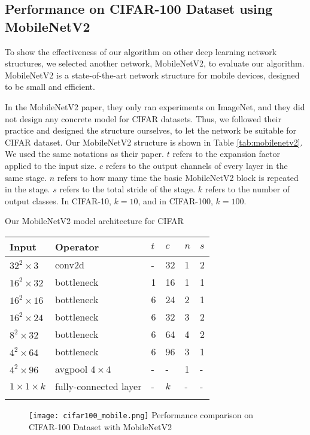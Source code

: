 \subsection{Performance on CIFAR-100 Dataset using MobileNetV2}

To show the effectiveness of our algorithm on other deep learning network structures, we selected another network, MobileNetV2\cite{sandler2018inverted}, to evaluate our algorithm. MobileNetV2 is a state-of-the-art network structure for mobile devices, designed to be small and efficient.

In the MobileNetV2 paper, they only ran experiments on ImageNet, and they did not design any concrete model for CIFAR datasets. Thus, we followed their practice and designed the structure ourselves, to let the network be suitable for CIFAR dataset. Our MobileNetV2 structure is shown in Table \ref{tab:mobilenetv2}. We used the same notations as their paper. $t$ refers to the expansion factor applied to the input size. $c$ refers to the output channels of every layer in the same stage. $n$ refers to how many time the basic MobileNetV2 block is repeated in the stage. $s$ refers to the total stride of the stage. $k$ refers to the number of output classes. In CIFAR-10, $k=10$, and in CIFAR-100, $k=100$.
\begin{table}[!hpb]
	\centering
	{Our MobileNetV2 model architecture for CIFAR}
	\label{tab:mobilenetv2}
	\begin{tabular}{@{}llllll@{}} \toprule
		Input & Operator & $t$ & $c$ & $n$ & $s$\\ \midrule
		$32^2\times3$ & conv2d & - &32&1&2\\ 
		$16^2\times32$ & bottleneck & 1 &16&1&1\\ 
		$16^2\times16$ & bottleneck & 6 &24&2&1\\ 
		$16^2\times24$ & bottleneck & 6 &32&3&2\\ 
		$8^2\times32$ & bottleneck & 6 &64&4&2\\ 		
		$4^2\times64$ & bottleneck & 6 &96&3&1\\ 
		$4^2\times96$ & avgpool $4\times4$ & - &-&1&-\\ 	
		$1\times1\times k$ & fully-connected layer & - &$k$&-&-\\ 				
		\bottomrule
		\label{tab:cifar100_mobile}
	\end{tabular}
\end{table}
\begin{figure}[!htp]
	\centering
	\texttt{[image: cifar100\_mobile.png]}
	{Performance comparison on CIFAR-100 Dataset with MobileNetV2}
	\label{fig:cifar100_mobile}
\end{figure}


